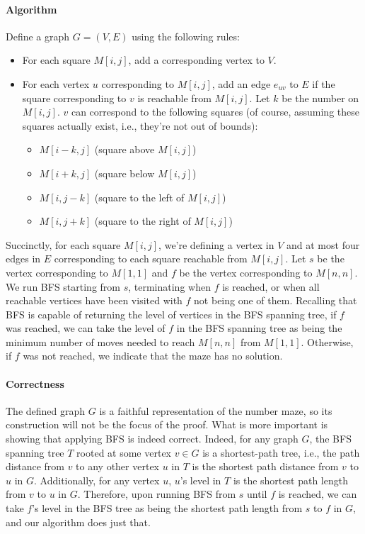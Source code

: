 \documentclass{article}
\begin{document}
\begin{enumerate}
\paragraph{Algorithm}
Define a graph $G = (V, E)$ using the following rules:
\begin{itemize}
\item For each square $M[i, j]$, add a corresponding vertex to $V$.
\item For each vertex $u$ corresponding to $M[i, j]$, add an edge $e_{uv}$ to $E$ if the square corresponding to $v$ is reachable from $M[i, j]$. Let $k$ be the number on $M[i, j]$. $v$ can correspond to the following squares (of course, assuming these squares actually exist, i.e., they're not out of bounds):
\begin{itemize}
\item $M[i - k, j]$ (square above $M[i, j]$)
\item $M[i + k, j]$ (square below $M[i, j]$)
\item $M[i, j - k]$ (square to the left of $M[i, j]$)
\item $M[i, j + k]$ (square to the right of $M[i, j]$)
\end{itemize}
\end{itemize}
Succinctly, for each square $M[i, j]$, we're defining a vertex in $V$ and at most four edges in $E$ corresponding to each square reachable from $M[i, j]$. Let $s$ be the vertex corresponding to $M[1, 1]$ and $f$ be the vertex corresponding to $M[n, n]$. We run BFS starting from $s$, terminating when $f$ is reached, or when all reachable vertices have been visited with $f$ not being one of them. Recalling that BFS is capable of returning the level of vertices in the BFS spanning tree, if $f$ was reached, we can take the level of $f$ in the BFS spanning tree as being the minimum number of moves needed to reach $M[n, n]$ from $M[1, 1]$. Otherwise, if $f$ was not reached, we indicate that the maze has no solution.

\paragraph{Correctness}
The defined graph $G$ is a faithful representation of the number maze, so its construction will not be the focus of the proof. What is more important is showing that applying BFS is indeed correct. Indeed, for any graph $G$, the BFS spanning tree $T$ rooted at some vertex $v \in G$ is a shortest-path tree, i.e., the path distance from $v$ to any other vertex $u$ in $T$ is the shortest path distance from $v$ to $u$ in $G$. Additionally, for any vertex $u$, $u$'s level in $T$ is the shortest path length from $v$ to $u$ in $G$. Therefore, upon running BFS from $s$ until $f$ is reached, we can take $f$'s level in the BFS tree as being the shortest path length from $s$ to $f$ in $G$, and our algorithm does just that.


\end{enumerate}
\end{document}
